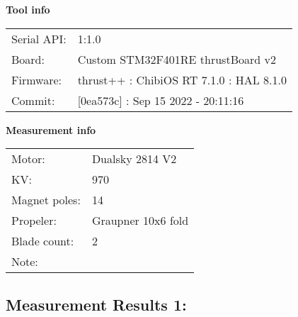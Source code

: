 \documentclass[10pt]{article}
\begin{document}
\noindent
{\large \bf Tool info}
\vspace{3mm}

\noindent
\begin{tabular}{ll}
Serial API:  & 1:1.0\\ 
Board:       & Custom STM32F401RE thrustBoard v2\\ 
Firmware:    & thrust++ : ChibiOS RT 7.1.0 : HAL 8.1.0\\ 
Commit:      & [0ea573c] : Sep 15 2022 - 20:11:16
\end{tabular}
\vspace{3mm}

\noindent
{\large \bf Measurement info}
\vspace{3mm}

\noindent
\begin{tabular}{ll}
Motor:        & Dualsky 2814 V2\\ 
KV:           & 970\\ 
Magnet poles: & 14\\ 
Propeler:     & Graupner 10x6 fold\\ 
Blade count:  & 2\\ 
Note:         & 
\end{tabular}

\vspace{3mm}


\subsection*{\large \bf Measurement Results 1:}
\end{document}
